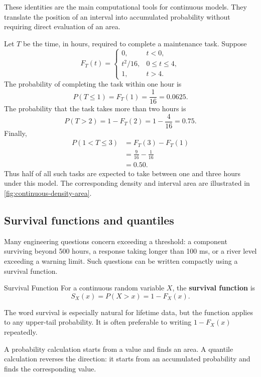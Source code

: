 These identities are the main computational tools for continuous models. They translate the position of an interval into accumulated probability without requiring direct evaluation of an area.

\begin{example}\label{ex:completion-time-cdf}\par
Let $T$ be the time, in hours, required to complete a maintenance task. Suppose
\[
F_T(t)=
\begin{cases}
0, & t<0,\\
t^2/16, & 0\leq t\leq4,\\
1, & t>4.
\end{cases}
\]
The probability of completing the task within one hour is
\[
    P(T\leq1)=F_T(1)=\frac{1}{16}=0.0625.
\]
The probability that the task takes more than two hours is
\[
    P(T>2)=1-F_T(2)=1-\frac{4}{16}=0.75.
\]
Finally,
\[
\begin{aligned}
P(1<T\leq3)
  &=F_T(3)-F_T(1)\\
  &=\frac{9}{16}-\frac{1}{16}\\
  &=0.50.
\end{aligned}
\]
Thus half of all such tasks are expected to take between one and three hours under this model. The corresponding density and interval area are illustrated in \autoref{fig:continuous-density-area}.
\end{example}

\subsection{Survival functions and quantiles}

Many engineering questions concern exceeding a threshold: a component surviving beyond 500 hours, a response taking longer than 100 ms, or a river level exceeding a warning limit. Such questions can be written compactly using a survival function.

\begin{definition}{Survival Function}
For a continuous random variable $X$, the \textbf{survival function} is
\[
    S_X(x)=P(X>x)=1-F_X(x).
\]
\end{definition}

The word survival is especially natural for lifetime data, but the function applies to any upper-tail probability. It is often preferable to writing $1-F_X(x)$ repeatedly.

A probability calculation starts from a value and finds an area. A quantile calculation reverses the direction: it starts from an accumulated probability and finds the corresponding value.

